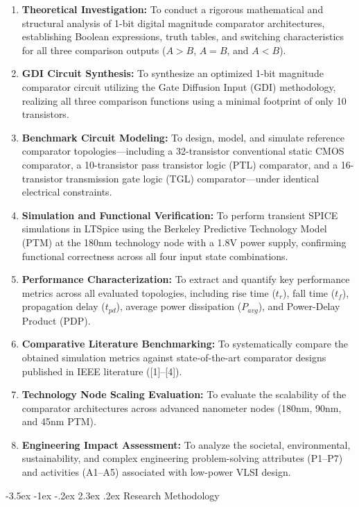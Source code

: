 \documentclass[12pt,a4paper,oneside]{report}
\makeatletter
\renewcommand\section{\@startsection {section}{1}{\z@}%
                                   {-3.5ex \@plus -1ex \@minus -.2ex}%
                                   {2.3ex \@plus.2ex}%
                                   {\normalfont\normalsize\bfseries}}
\makeatother
\begin{document}
\begin{enumerate}
\item \textbf{Theoretical Investigation:} To conduct a rigorous mathematical and structural analysis of 1-bit digital magnitude comparator architectures, establishing Boolean expressions, truth tables, and switching characteristics for all three comparison outputs ($A>B$, $A=B$, and $A<B$).
\item \textbf{GDI Circuit Synthesis:} To synthesize an optimized 1-bit magnitude comparator circuit utilizing the Gate Diffusion Input (GDI) methodology, realizing all three comparison functions using a minimal footprint of only 10 transistors.
\item \textbf{Benchmark Circuit Modeling:} To design, model, and simulate reference comparator topologies—including a 32-transistor conventional static CMOS comparator, a 10-transistor pass transistor logic (PTL) comparator, and a 16-transistor transmission gate logic (TGL) comparator—under identical electrical constraints.
\item \textbf{Simulation and Functional Verification:} To perform transient SPICE simulations in LTSpice using the Berkeley Predictive Technology Model (PTM) at the 180nm technology node with a 1.8V power supply, confirming functional correctness across all four input state combinations.
\item \textbf{Performance Characterization:} To extract and quantify key performance metrics across all evaluated topologies, including rise time ($t_r$), fall time ($t_f$), propagation delay ($t_{pd}$), average power dissipation ($P_{avg}$), and Power-Delay Product (PDP).
\item \textbf{Comparative Literature Benchmarking:} To systematically compare the obtained simulation metrics against state-of-the-art comparator designs published in IEEE literature ([1]--[4]).
\item \textbf{Technology Node Scaling Evaluation:} To evaluate the scalability of the comparator architectures across advanced nanometer nodes (180nm, 90nm, and 45nm PTM).
\item \textbf{Engineering Impact Assessment:} To analyze the societal, environmental, sustainability, and complex engineering problem-solving attributes (P1--P7) and activities (A1--A5) associated with low-power VLSI design.
\end{enumerate}

\section{Research Methodology}
\end{document}
